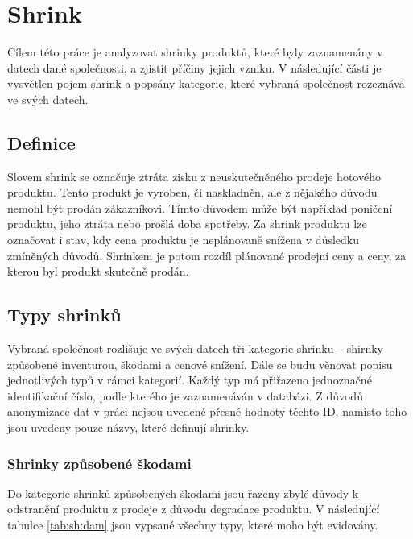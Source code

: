 \chapter{Shrink}

Cílem této práce je analyzovat shrinky produktů, které byly zaznamenány v datech dané společnosti, a zjistit příčiny jejich vzniku. V následující části je vysvětlen pojem shrink a popsány kategorie, které vybraná společnost rozeznává ve svých datech.

\section{Definice}

Slovem shrink se označuje ztráta zisku z neuskutečněného prodeje hotového produktu. Tento produkt je vyroben, či naskladněn, ale z nějakého důvodu nemohl být prodán zákazníkovi. Tímto důvodem může být například poničení produktu, jeho ztráta nebo prošlá doba spotřeby. Za shrink produktu lze označovat i stav, kdy cena produktu je neplánovaně snížena v důsledku zmíněných důvodů. Shrinkem je potom rozdíl plánované prodejní ceny a ceny, za kterou byl produkt skutečně prodán.\cite{bib:DefShrink}



\section{Typy shrinků}

Vybraná společnost rozlišuje ve svých datech tři kategorie shrinku -- shirnky způsobené inventurou, škodami a cenové snížení. Dále se budu věnovat popisu jednotlivých typů v rámci kategorií. Každý typ má přiřazeno jednoznačné identifikační číslo, podle kterého je zaznamenáván v databázi. Z důvodů anonymizace dat v práci nejsou uvedené přesné hodnoty těchto ID, namísto toho jsou uvedeny pouze názvy, které definují shrinky.

\subsection*{Shrinky způsobené škodami}

Do kategorie shrinků způsobených škodami jsou řazeny zbylé důvody k odstranění produktu z prodeje z důvodu degradace produktu. V následující tabulce \ref{tab:sh:dam} jsou vypsané všechny typy, které moho být evidovány.

